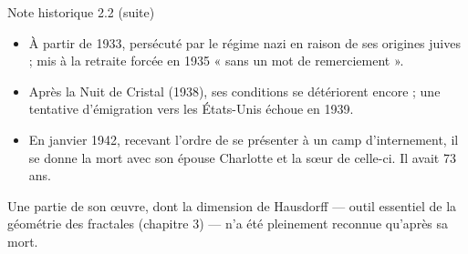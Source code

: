 \begin{frame}{Note historique 2.2 (suite)}
  \small
  \begin{itemize}
    \item À partir de 1933, persécuté par le régime nazi en raison de
      ses origines juives ; mis à la retraite forcée en 1935 « sans un
      mot de remerciement ».
    \item Après la Nuit de Cristal (1938), ses conditions se
      détériorent encore ; une tentative d'émigration vers les
      États-Unis échoue en 1939.
    \item En janvier 1942, recevant l'ordre de se présenter à un camp
      d'internement, il se donne la mort avec son épouse Charlotte et
      la sœur de celle-ci. Il avait 73 ans.
  \end{itemize}
  \vspace{4pt}
  Une partie de son œuvre, dont la dimension de Hausdorff ---
  outil essentiel de la géométrie des fractales (chapitre 3) --- n'a été
  pleinement reconnue qu'après sa mort.
\end{frame}

